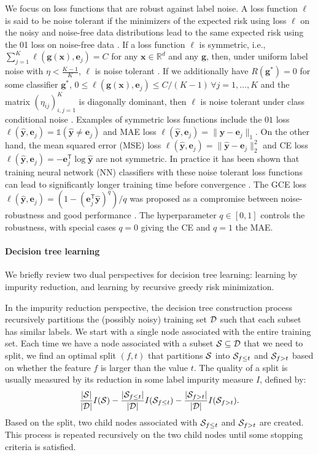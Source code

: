 \documentclass[letterpaper]{article} %
\newcommand{\R}{{\mathbb{R}}}
\newcommand{\bx}{{\bm{x}}}
\newcommand{\bg}{{\bm{g}}}
\newcommand{\by}{{\bm{y}}}
\newcommand{\be}{{\bm{e}}}
\newcommand{\T}{{\mathsf{T}}}
\newcommand{\I}{\mathds{1}}
\newcommand{\cS}{{\cal{S}}}
\newcommand{\cD}{{\cal{D}}}
\begin{document}
We focus on loss functions that are robust against label noise.
A loss function $\ell$ is said to be noise tolerant if the minimizers of the
expected risk using loss $\ell$ on the noisy and noise-free data distributions
lead to the same expected risk using the 01 loss on noise-free data
\cite{manwani2013noise}.
If a loss function $\ell$ is symmetric, i.e.,
$\sum_{j=1}^K \ell(\bg(\bx),\be_j)=C$ for any $\bx\in\R^d$ and any $\bg$,
then, under uniform label noise with $\eta<\frac{K-1}{K}$, $\ell$ is noise tolerant \cite{ghosh2015making,ghosh2017robust}.
If we additionally have
$R(\bg^*)=0$ for some classifier $\bg^{*}$,
$0\leq \ell(\bg(\bx),\be_j)\leq C/(K-1)\,\forall j=1,\ldots,K$
and the matrix
$(\eta_{ij})_{i,j=1}^K$
is diagonally dominant, then $\ell$ is noise tolerant under class conditional noise \cite{ghosh2017robust}.
Examples of symmetric loss functions include the $01$ loss $\ell(\widehat{\by},\be_j)=\I(\widehat{\by}\ne \be_j)$
and MAE loss $\ell(\widehat{\by},\be_j) = \|\widehat{\by}-\be_j\|_1$.
On the other hand, the mean squared error (MSE) loss
$\ell(\widehat{\by},\be_j)=\|\widehat{\by}-\be_j\|_2^2$ and CE
loss $\ell(\widehat{\by},\be_j) = -\be_j^\T\log \widehat{\by}$ are not
symmetric.
In practice it has been shown that training neural network (NN) classifiers with these noise tolerant loss functions can lead to significantly longer training time before convergence \cite{zhang2018generalized}.
The GCE loss $\ell(\widehat{\by},\be_j)=(1-(\be_j^\T
\widehat{\by})^q)/q$ was proposed as a compromise between noise-robustness and
good performance \cite{zhang2018generalized}. The hyperparameter $q\in[0,1]$
controls the robustness, with special cases $q=0$ giving the CE and $q=1$ the
MAE.

\paragraph{Decision tree learning}
We briefly review two dual perspectives for decision tree learning:
learning by impurity reduction, and learning by recursive greedy risk minimization.

In the impurity reduction perspective, the decision tree construction process
recursively partitions the (possibly noisy) training set $\cD$ such that each
subset has similar labels.
We start with a single node associated with the entire training set.
Each time we have a node associated with a subset $\cS \subseteq \cD$ that we
need to split, we find an optimal split $(f,t)$ that partitions $\cS$ into
$\cS_{f \leq t}$ and $\cS_{f > t}$ based on whether the feature $f$ is larger
than the value $t$.
The quality of a split is usually measured by its reduction in some label
impurity measure $I$, defined by:
\[
    \frac{|\cS|}{|\cD|}I(\cS) - \frac{|\cS_{f\leq t}|}{|\cD|}I(\cS_{f\leq t}) - \frac{|\cS_{f> t}|}{|\cD|}I(\cS_{f> t}).
\]
Based on the split, two child nodes associated with $\cS_{f \leq t}$ and
$\cS_{f > t}$ are created.
This process is repeated recursively on the two child nodes until some stopping
criteria is satisfied.
\end{document}
